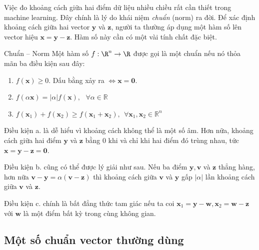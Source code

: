 Việc đo khoảng cách giữa hai điểm dữ liệu nhiều chiều rất cần thiết trong
machine learning. Đây chính là lý do khái niệm \textit{chuẩn} ({norm}) ra
đời. Để xác định khoảng cách giữa hai vector $\mathbf{y}$ và $\mathbf{z}$, người
ta thường áp dụng một hàm số lên vector hiệu $\mathbf{x = y - z}$. Hàm số này
cần có một vài tính chất đặc biệt.

\begin{mydef}{Chuẩn -- Norm}
 Một hàm số $f: \R^n \rightarrow \R$ được gọi là một chuẩn nếu nó thỏa mãn ba
điều kiện sau đây:
\begin{enumerate}

    \item $f(\mathbf{x}) \geq 0$. Dấu bằng xảy ra $\Leftrightarrow \mathbf{x = 0} $.

    \item $f(\alpha \mathbf{x}) = |\alpha| f(\mathbf{x}), ~~~\forall \alpha \in \mathbb{R}\ $

    \item $f(\mathbf{x}_1) + f(\mathbf{x}_2) \geq f(\mathbf{x}_1 + \mathbf{x}_2),
    ~~\forall \mathbf{x}_1, \mathbf{x}_2 \in \mathbb{R}^n$

\end{enumerate}\end{mydef}

{Điều kiện a.} là dễ hiểu vì khoảng cách không thể là một số âm.
Hơn nữa, khoảng cách giữa hai điểm $\mathbf{y}$ và $\mathbf{z}$ bằng 0 khi và
chỉ khi hai điểm đó trùng nhau, tức $\mathbf{x = y - z = 0} $.

{Điều kiện b.} cũng có thể được lý giải như sau. Nếu ba điểm
$\mathbf{y, v}$ và $\mathbf{z}$ thẳng hàng, hơn nữa
$\mathbf{v - y} = \alpha (\mathbf{v - z}) $ thì khoảng cách giữa $\mathbf{v}$ và
$\mathbf{y}$ gấp $ |\alpha |$ lần khoảng cách giữa $\mathbf{v}$ và
$\mathbf{z}$.

{Điều kiện c.} chính là bất đẳng thức tam giác nếu ta coi
$\mathbf{x}_1 = \mathbf{y - w}, \mathbf{x}_2 = \mathbf{w - z} $ với
$\mathbf{w}$ là một điểm bất kỳ trong cùng không gian.



\subsection{Một số chuẩn vector thường dùng}
\label{sub:norms} 

